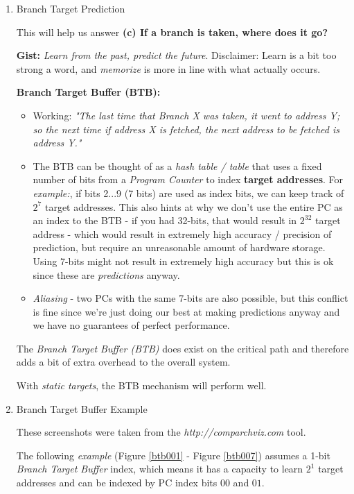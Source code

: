\documentclass[12pt]{article}
\newenvironment{QandA}{\begin{enumerate}[label=\bfseries\arabic*.]\bfseries}
                      {\end{enumerate}}
\newenvironment{answered}{\par\quad\normalfont}{}
\begin{document}
\begin{QandA}
\begin{answered}
\end{answered}

\item Branch Target Prediction
\begin{answered}
This will help us answer \textbf{(c) If a branch is taken, where does it go?}

\textbf{Gist:} \textit{Learn from the past, predict the future}. Disclaimer: Learn is a bit too strong a word, and \textit{memorize} is more in line with what actually occurs.

\textbf{Branch Target Buffer (BTB):}
\begin{itemize}
    \item Working: \textit{"The last time that Branch X was taken, it went to address Y; so the next time if address X is fetched, the next address to be fetched is address Y."}
    \item The BTB can be thought of as a \textit{hash table / table} that uses a fixed number of bits from a \textit{Program Counter} to index \textbf{target addresses}. For \textit{example:}, if bits 2$...$9 (7 bits) are used as index bits, we can keep track of $2^{7}$ target addresses. This also hints at why we don't use the entire PC as an index to the BTB - if you had 32-bits, that would result in $2^{32}$ target address - which would result in extremely high accuracy / precision of prediction, but require an unreasonable amount of hardware storage. Using 7-bits might not result in extremely high accuracy but this is ok since these are \textit{predictions} anyway.
    \item \textit{Aliasing} - two PCs with the same 7-bits are also possible, but this conflict is fine since we're just doing our best at making predictions anyway and we have no guarantees of perfect performance.
\end{itemize}

The \textit{Branch Target Buffer (BTB)} does exist on the critical path and therefore adds a bit of extra overhead to the overall system. 

With \textit{static targets}, the BTB mechanism will perform well.
\end{answered}

\item Branch Target Buffer Example
\begin{answered}
These screenshots were taken from the \textit{http://comparchviz.com} tool.

The following \textit{example} (Figure \ref{btb001} - Figure \ref{btb007}) assumes a 1-bit \textit{Branch Target Buffer} index, which means it has a capacity to learn $2^{1}$ target addresses and can be indexed by PC index bits $00$ and $01$.


\end{answered}
\end{QandA}
\end{document}

